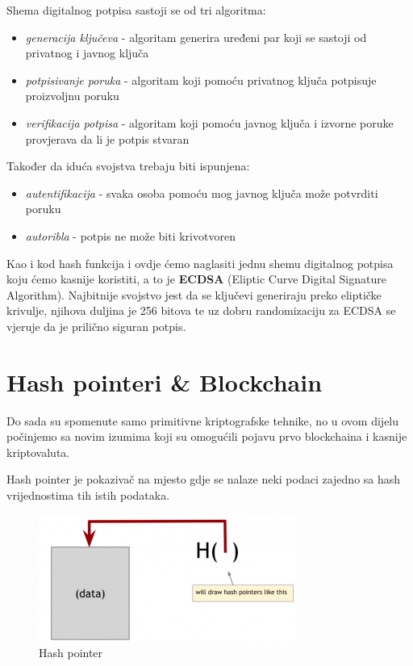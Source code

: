 \documentclass[12pt]{report}
\begin{document}
\begin{definicija}
Shema digitalnog potpisa sastoji se od tri algoritma: 
\begin{itemize}
    \item \textit{generacija ključeva} - algoritam generira uređeni par koji se sastoji od privatnog i javnog ključa
    \item \textit{potpisivanje poruka} - algoritam koji pomoću privatnog ključa potpisuje proizvoljnu poruku
    \item \textit{verifikacija potpisa} - algoritam koji pomoću javnog ključa i izvorne poruke provjerava da li je potpis stvaran
\end{itemize}
Također da iduća svojstva trebaju biti ispunjena:
\begin{itemize}
    \item \textit{autentifikacija} - svaka osoba pomoću mog javnog ključa može potvrditi poruku
    \item \textit{autoribla} - potpis ne može biti krivotvoren
\end{itemize}
\end{definicija}

Kao i kod hash funkcija i ovdje ćemo naglasiti jednu shemu digitalnog potpisa koju ćemo kasnije koristiti, a to je \textbf{ECDSA} (Eliptic Curve Digital Signature Algorithm). Najbitnije svojstvo jest da se ključevi generiraju preko eliptičke krivulje, njihova duljina je 256 bitova te uz dobru randomizaciju za ECDSA se vjeruje da je prilično siguran potpis.

\section{Hash pointeri \& Blockchain}

Do sada su spomenute samo primitivne kriptografske tehnike, no u ovom dijelu počinjemo sa novim izumima koji su omogućili pojavu prvo blockchaina i kasnije kriptovaluta. 

\begin{definicija}
Hash pointer je pokazivač na mjesto gdje se nalaze neki podaci zajedno sa hash vrijednostima tih istih podataka.
\end{definicija}

\begin{figure}[h]
\centering
\includegraphics[scale=0.6]{hash_pointer}
\caption{Hash pointer}
\end{figure}
\end{document}

